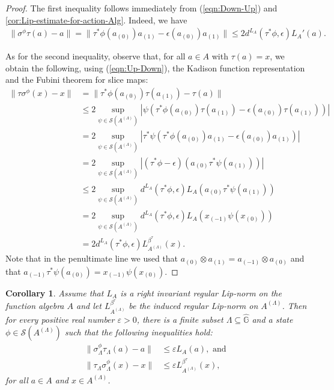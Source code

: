 \documentclass{amsart}
\theoremstyle{plain}
\newtheorem{corollary}[theorem]{Corollary}
\theoremstyle{definition}
\theoremstyle{remark}
\begin{document}
	\begin{proof}
		The first inequality follows immediately from (\ref{eqn:Down-Up}) and  \autoref{cor:Lip-estimate-for-action-Alg}.
		Indeed, we have
		\begin{align}
			\lVert\sigma^\phi\tau(a)-a\rVert
			= \lVert\tau^*\phi(a_{(0)})a_{(1)} - \epsilon(a_{(0)})a_{(1)}\rVert
			\leq 2 d^{L_A}(\tau^*\phi,\epsilon) L_A'(a).
		\end{align}
		
		As for the second inequality, observe that, for all $a \in A$ with $\tau(a) = x$, we obtain the following, using (\ref{eqn:Up-Down}), the Kadison function representation and the Fubini theorem for slice maps:
		\begin{align}
			\lVert\tau\sigma^\phi(x) - x\rVert
			&= \lVert\tau^*\phi(a_{(0)})\tau(a_{(1)}) - \tau(a)\rVert \\
			&\leq 2 \sup_{\psi \in \mathcal{S}(A^{(\Lambda)})} \left|\psi \left(\tau^*\phi(a_{(0)})\tau(a_{(1)}) - \epsilon(a_{(0)})\tau(a_{(1)})\right)\right| \\
			&= 2 \sup_{\psi \in \mathcal{S}(A^{(\Lambda)})} \left|\tau^*\psi\left(\tau^*\phi(a_{(0)})a_{(1)} - \epsilon(a_{(0)})a_{(1)}\right)\right| \\
			&= 2 \sup_{\psi \in \mathcal{S}(A^{(\Lambda)})} | (\tau^*\phi - \epsilon) (a_{(0)} \tau^*\psi(a_{(1)})) | \\
			&\leq 2 \sup_{\psi \in \mathcal{S}(A^{(\Lambda)})} d^{L_A}(\tau^*\phi,\epsilon) L_A(a_{(0)} \tau^*\psi(a_{(1)})) \\
			&= 2 \sup_{\psi \in \mathcal{S}(A^{(\Lambda)})} d^{L_A}(\tau^*\phi,\epsilon) L_A(x_{(-1)} \psi(x_{(0)})) \\
			&= 2 d^{L_A}(\tau^*\phi,\epsilon) L_{A^{(\Lambda)}}^{\beta^\tau}(x).
		\end{align}
		Note that in the penultimate line we used that $a_{(0)} \otimes a_{(1)} = a_{(-1)} \otimes a_{(0)}$ and that $a_{(-1)} \tau^*\psi(a_{(0)}) = x_{(-1)} \psi(x_{(0)})$.
	\end{proof}
	
	\begin{corollary}\label{cor:Lip-norm-estimates-Up-Down-Down-Up}
		Assume that $L_A$ is a right invariant regular Lip-norm on the function algebra $A$ and let $L_{A^{(\Lambda)}}^{\beta^\tau}$ be the induced regular Lip-norm on $A^{(\Lambda)}$.
		Then for every positive real number $\varepsilon > 0$, there is a finite subset $\Lambda \subseteq \widehat{\mathbb{G}}$ and a state $\phi \in \mathcal{S}(A^{(\Lambda)})$ such that the following inequalities hold:
		\begin{align}
			\lVert\sigma_\Lambda^\phi\tau_\Lambda(a)-a\rVert 
			&\leq \varepsilon L_A(a), \text{ and } \\
			\lVert\tau_\Lambda\sigma_\Lambda^\phi(x)-x\rVert
			&\leq \varepsilon L_{A^{(\Lambda)}}^{\beta^\tau}(x),
		\end{align}
		for all $a \in A$ and $x \in A^{(\Lambda)}$.
	\end{corollary}
	
\end{document}
